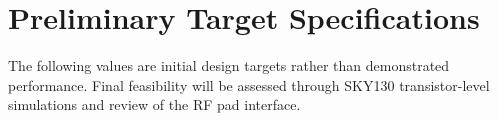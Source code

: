 
\section{Preliminary Target Specifications}

The following values are initial design targets rather than demonstrated performance.
Final feasibility will be assessed through SKY130 transistor-level simulations and review of the RF pad interface.

